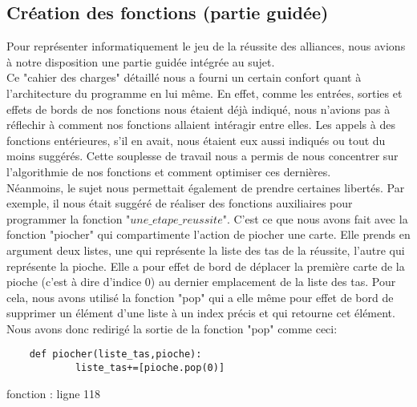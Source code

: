\documentclass[10pt,a4paper,french,titlepage]{article}
\begin{document}
\subsection{Création des fonctions (partie guidée)}
Pour représenter informatiquement le jeu de la réussite des alliances, nous avions à notre disposition une partie guidée intégrée au sujet.\\
Ce "cahier des charges" détaillé nous a fourni un certain confort quant à l'architecture du programme en lui même. En effet, comme les entrées, 
sorties et effets de bords de nos fonctions nous étaient déjà indiqué, nous n'avions pas à réflechir à comment nos fonctions allaient intéragir entre elles. Les appels à des fonctions entérieures, s'il en avait, nous étaient eux aussi indiqués ou tout du moins suggérés. Cette souplesse de travail nous
a permis de nous concentrer sur l'algorithmie de nos fonctions et comment optimiser ces dernières.\\
\tabto{1cm}Néanmoins, le sujet nous permettait également de prendre certaines libertés. Par exemple, il nous était suggéré de réaliser des fonctions
auxiliaires pour programmer la fonction "$une\_etape\_reussite$". C'est ce que nous avons fait avec la fonction "piocher" qui compartimente l'action de 
piocher une carte. Elle prends en argument deux listes, une qui représente la liste des tas de la réussite, l'autre qui représente la pioche. Elle a 
pour effet de bord de déplacer la première carte de la pioche (c'est à dire d'indice 0) au dernier emplacement de la liste des tas. Pour cela, nous 
avons utilisé la fonction "pop" qui a elle même pour effet de bord de supprimer un élément d'une liste à un index précis et qui retourne cet élément.
Nous avons donc redirigé la sortie de la fonction "pop" comme ceci:\\
\begin{lstlisting}
	def piocher(liste_tas,pioche):
    		liste_tas+=[pioche.pop(0)]
\end{lstlisting}
\caption{fonction : ligne 118\\} 
\end{document}
